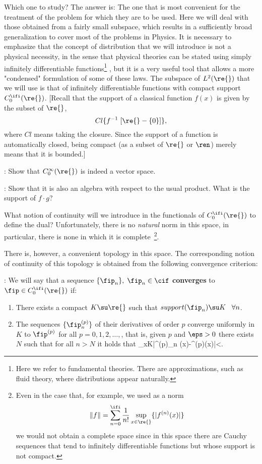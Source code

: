Which one to study? The answer is: The one that is most convenient for the treatment of the problem for which they are to be used. 
Here we will deal with those obtained from a fairly small subspace, which results in a sufficiently broad generalization to cover most of the problems in Physics. It is necessary to emphasize that the concept of distribution that we will introduce is not a physical necessity, in the sense that physical theories can be stated using simply infinitely differentiable functions\footnote{
Here we refer to fundamental theories. There are approximations, such as fluid theory, where distributions appear naturally.}
, but it is a very useful tool that allows a more "condensed" formulation of some of these laws.
%
The subspace of $L^2(\re{})$ that we will use is that of infinitely differentiable functions with compact support $C_0^{\ifi}(\re{})$. [Recall that the support of a classical function $f(x)$ is given by the subset of $\re{}$, 
\[
Cl\{f^{-1}\;[\re{}-\{0\}]\},
\]
%
where $Cl$ means taking the closure. Since the support of a function is automatically closed, being compact (as a subset of $\re{}$ or $\ren$) merely means that it is bounded.]


\espa

\ejer: Show that $C^{\infty}_0(\re{})$ is indeed a vector space.

\espa
\ejer: 
Show that it is also an algebra with respect to the usual product. What is the support of $f\cdot g$?
\espa

What notion of continuity will we introduce in the functionals of $C^{\ifi}_0(\re{})$ to define the dual? Unfortunately, there is no {\sl natural} norm in this space, in particular, there is none in which it is complete~\footnote{Even in the case that, for example, we used as a norm 
$$
\|f\|=\sum_{n=0}^{\ifi}\frac 1{n!} \sup_{x\in\re{}}\{|f^{(n)}(x)|\}
$$
we would not obtain a complete space since in this space there are Cauchy sequences that tend to infinitely differentiable functions but whose support is not compact.}.

There is, however, a convenient topology in this space.
The corresponding notion of continuity of this topology is obtained from the following convergence criterion:

\espa

:
We will say that a sequence
$\{\fip_n\},\;\fip_n\in\cif $ 
{\bf converges} to $\fip 
\in C_0^{\ifi}(\re{})$ if:
\begin{enumerate}
\item There exists a compact $K \su \re{}$ such that $support(\fip_n) \su K
\;\;\;\forall n$.
\item The sequences $\{\fip^{(p)}_n\}$ of their derivatives of order $p$ 
converge uniformly in $K$ to $\fip^{(p)}$ for all 
$p=0,1,2,\ldots,$, that is, given $p$ and $\eps > 0$ there exists $N$ such that
for all $n>N$ it holds that 
\beq
\sup_{x\in K}|\fip^{(p)}_n (x)-\fip^{(p)}(x)|<\eps.
\eeq
\end{enumerate}

